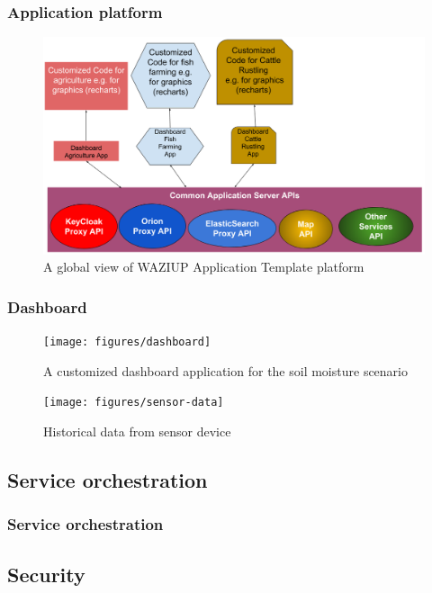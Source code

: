 \documentclass{beamer}
\begin{document}
\begin{frame}
\frametitle{Application platform}

  \begin{figure}[H]  
  \centering  
  \includegraphics[width=.68\linewidth]{figures/AppArchitecture.png}   
  \caption{A global view of WAZIUP Application Template platform}
  \label{fig-app}
  \end{figure}
 
\end{frame}

\begin{frame}
\frametitle{Dashboard}

  \begin{figure}[H]  
  \centering  
  \texttt{[image: figures/dashboard]} 
  \caption{A customized dashboard application for the soil moisture scenario}
  \label{fig-dashboard}
  \end{figure}
  
  \vspace{-1cm}
  \begin{figure}[H]  
  \centering  
  \texttt{[image: figures/sensor-data]}
  \caption{Historical data from sensor device}
  \label{fig-sensor-data}
  \end{figure}
 
\end{frame}

\subsection{Service orchestration}


\begin{frame}
\frametitle{Service orchestration}

\end{frame}

\subsection{Security}
\end{document}
